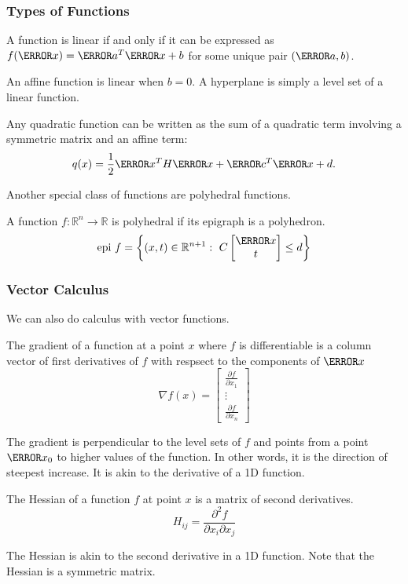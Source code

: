 \subsubsection{Types of Functions}
\begin{theorem}
  A function is linear if and only if it can be expressed as $f(\V{x}) = \V{a}^T\V{x}+b$ for some unique pair $(\V{a}, b)$.
  \label{thm:linear-ip}
\end{theorem}
An affine function is linear when $b=0$. A hyperplane is simply a level set of a linear function.
\begin{theorem}
	Any quadratic function can be written as the sum of a quadratic term involving a symmetric matrix and an affine term:
	\[
		q(x) = \frac{1}{2}\V{x}^TH\V{x}+\V{c}^T\V{x} + d.
	\]
	\label{thm:quadratic}
\end{theorem}
Another special class of functions are polyhedral functions.
\begin{definition}
	A function $f:\mathbb{R}^n\to\mathbb{R}$ is polyhedral if its epigraph is a polyhedron.
	\[
		\text{epi } f = \left\{(x,t) \in \mathbb{R}^{n+1} :\ C \begin{bmatrix}\V{x} \\ t \end{bmatrix} \leq d \right\}
	\]
	\label{defn:polyhedral-function}
\end{definition}
\subsubsection{Vector Calculus}
We can also do calculus with vector functions.
\begin{definition}
  The gradient of a function at a point $x$ where $f$ is differentiable is a column vector of first derivatives of $f$ with respsect to the components of $\V{x}$
  \[
	\nabla f(x) = \begin{bmatrix}
	  \frac{\partial f}{\partial x_1}\\
	  \vdots\\
	  \frac{\partial f}{\partial x_n}
	\end{bmatrix}
  \]
  \label{defn:gradient}
\end{definition}
The gradient is perpendicular to the level sets of $f$ and points from a point $\V{x}_0$ to higher values of the function.
In other words, it is the direction of steepest increase.
It is akin to the derivative of a 1D function.
\begin{definition}
	The Hessian of a function $f$ at point $x$ is a matrix of second derivatives.
	\[
		H_{ij} = \frac{\partial^2 f}{\partial x_i \partial x_j}
	\]
	\label{defn:hessian}
\end{definition}
The Hessian is akin to the second derivative in a 1D function.
Note that the Hessian is a symmetric matrix.
